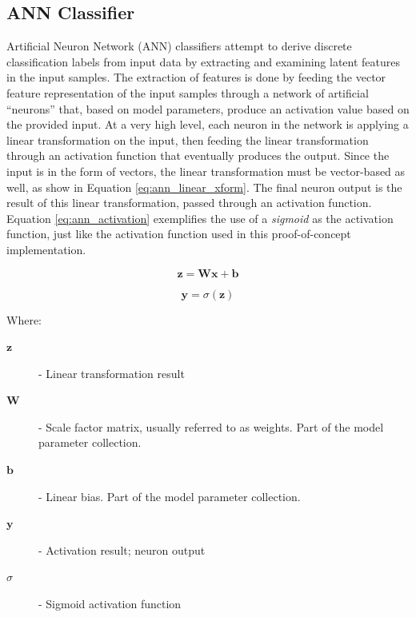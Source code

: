 \documentclass[conference]{sig-alternate-05-2015}
\begin{document}
\subsection{ANN Classifier}\label{subsec:ann_classfier}

Artificial Neuron Network (ANN) classifiers attempt to derive discrete
classification labels from input data by extracting and examining latent
features in the input samples. The extraction of features is done by feeding
the vector feature representation of the input samples through a network of
artificial ``neurons'' that, based on model parameters, produce an activation
value based on the provided input. At a very high level, each neuron in the
network is applying a linear transformation on the input, then feeding the
linear transformation through an activation function that eventually produces
the output. Since the input is in the form of vectors, the linear transformation
must be vector-based as well, as show in Equation \ref{eq:ann_linear_xform}. The
final neuron output is the result of this linear transformation, passed through
an activation function. Equation \ref{eq:ann_activation} exemplifies the use of
a \textit{sigmoid} as the activation function, just like the activation function
used in this proof-of-concept implementation.\par

\noindent\hrulefill
\begin{equation}
  \label{eq:ann_linear_xform}
  \textbf{z} = \textbf{W}\textbf{x} + \textbf{b}
\end{equation}

\begin{equation}
  \label{eq:ann_activation}
  \textbf{y} = \sigma(\textbf{z})
\end{equation}

\noindent Where:
\begin{description}
  \item[$\textbf{z}$] - Linear transformation result
  \item[$\textbf{W}$] - Scale factor matrix, usually referred to as weights.
  Part of the model parameter collection.
  \item[$\textbf{b}$] - Linear bias. Part of the model parameter collection.
  \item[$\textbf{y}$] - Activation result; neuron output
  \item[$\sigma$] - Sigmoid activation function 
\end{description}
\noindent\hrulefill
\end{document}
